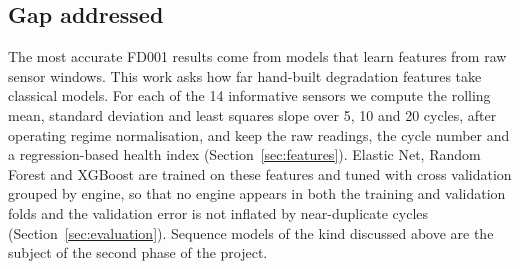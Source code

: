 \subsection{Gap addressed}
The most accurate FD001 results come from models that learn features from
raw sensor windows. This work asks how far hand-built degradation features
take classical models. For each of the 14 informative sensors we compute
the rolling mean, standard deviation and least squares slope over 5, 10
and 20 cycles, after operating regime normalisation, and keep the
raw readings, the cycle number and a regression-based health index
(Section~\ref{sec:features}). Elastic Net, Random Forest and XGBoost are
trained on these features and tuned with cross validation grouped by
engine, so that no engine appears in both the training and validation
folds and the validation error is not inflated by near-duplicate cycles
(Section~\ref{sec:evaluation}). Sequence models of the kind discussed
above are the subject of the second phase of the project.
